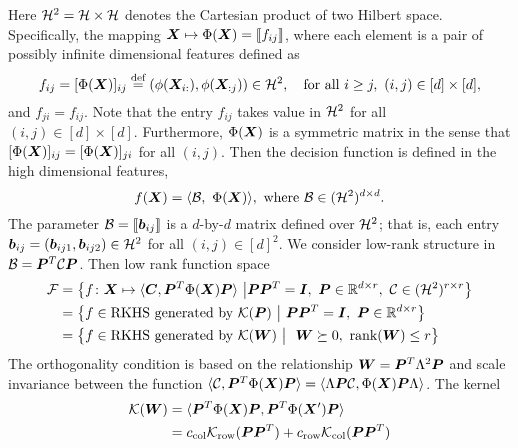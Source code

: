 \documentclass[12pt]{article}
\begin{document}
Here $\mathcal{H}^2=\mathcal{H}\times \mathcal{H}$ denotes the Cartesian product of two Hilbert space. Specifically, the mapping $\bm X\mapsto\Phi(\bm X)=\llbracket f_{ij} \rrbracket$, where each element is a pair of possibly infinite dimensional features defined as
\[
f_{ij}=[\Phi(\bm X)]_{ij}\stackrel{\text{def}}{=}(\phi(\bm X_{i:}), \phi(\bm X_{:j})) \in \mathcal{H}^2,\quad \text{for all }i\geq j,\ (i,j)\in[d]\times [d],
\]
and $f_{ji}=f_{ij}$. Note that the entry $f_{ij}$ takes value in $\mathcal{H}^2$ for all $(i,j)\in[d]\times [d]$. Furthermore, $\Phi(\bm X)$ is a symmetric matrix in the sense that $[\Phi(\bm X)]_{ij}=[\Phi(\bm X)]_{ji}$ for all $(i,j)$. 
Then the decision function is defined in the high dimensional features,
\[
f(\bm X)=\langle \mathcal{B},\ \Phi(\bm X)\rangle, \ \text{where } \mathcal{B} \in (\mathcal{H}^2)^{d\times d}.
\]
The parameter $\mathcal{B}=\llbracket \bm{b}_{ij} \rrbracket$ is a $d$-by-$d$ matrix defined over $\mathcal{H}^2$; that is, each entry $\bm{b}_{ij}=(\bm{b}_{ij1},\bm{b}_{ij2})\in \mathcal{H}^2$ for all $(i,j)\in[d]^2$. We consider low-rank structure in $\mathcal{B}=\bm{P}^T\mathcal{C}\bm{P}$. Then low rank function space
\begin{align}
\mathcal{F}&=\left\{f\colon \bm X\mapsto \langle \bm C, \bm{P}^T\Phi(\bm X)\bm{P} \rangle\ \big| \bm{P}\bm{P}^T=\bm I,\ \bm{P}\in\mathbb{R}^{d\times r},\ \mathcal{C}\in (\mathcal{H}^2)^{r\times r}  \right\}\\
&=\left\{ f\in\text{RKHS generated by $\mathcal{K}(\bm{P})$}\ \big|\ \bm{P}\bm{P}^T=\bm I,\ \bm{P}\in\mathbb{R}^{d\times r} \right\}\\
&=\left\{ f\in\text{RKHS generated by $\mathcal{K}(\bm{W})$}\ \big|\ \ \bm{W} \succeq 0,\ \text{rank}(\bm{W})\leq r\right\}
\end{align}
The orthogonality condition is based on the relationship $\bm{W}=\bm{P}^T\Lambda^2\bm{P}$ and scale invariance between the function $\langle \mathcal{C}, \bm{P}^T\Phi(\bm X)\bm{P}\rangle = \langle \Lambda\bm{P}\mathcal{C},\Phi(\bm X)\bm{P} \Lambda\rangle$.
The kernel 
\begin{align}
\mathcal{K}(\bm{W})&=\langle \bm{P}^T\Phi(\bm X)\bm{P},\bm{P}^T\Phi(\bm X')\bm{P}\rangle \\
&=c_{\text{col}}\mathcal{K}_{\text{row}}(\bm{P}\bm{P}^T)+c_{\text{row}}\mathcal{K}_{\text{col}}(\bm{P}\bm{P}^T)
\end{align} 
\end{document}
